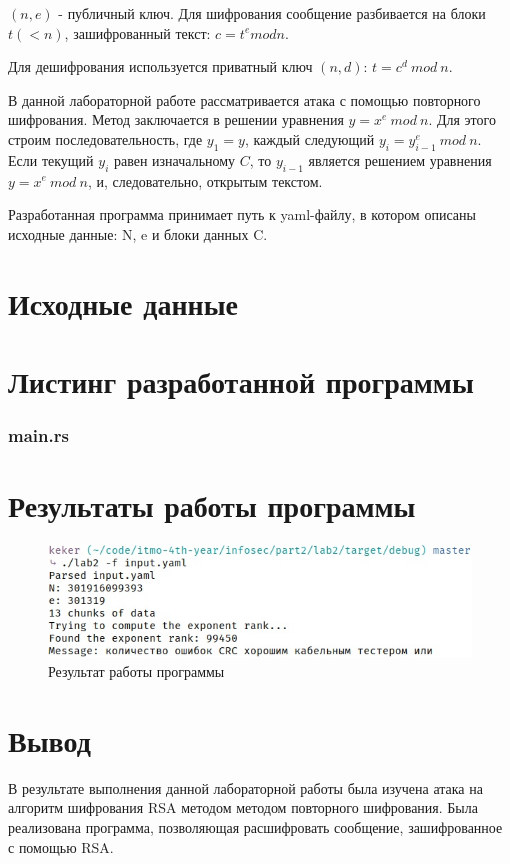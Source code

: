 \documentclass[12pt, a4paper]{article}
\begin{document}
$(n,e)$ - публичный ключ. Для шифрования сообщение разбивается на блоки $t (<n)$,
зашифрованный текст: $c = t^e mod n$.

Для дешифрования используется приватный ключ $(n,d)$: $t = c^d\:mod\:n$.

В данной лабораторной работе рассматривается атака с помощью повторного шифрования.
Метод заключается в решении уравнения $y = x^e\:mod\:n$. Для этого строим последовательность,
где $y_1 = y$, каждый следующий $y_i = y_{i-1}^e\:mod\:n$. Если текущий $y_i$ равен
изначальному $C$, то $y_{i-1}$ является решением уравнения $y = x^e\:mod\:n$, и,
следовательно, открытым текстом.

Разработанная программа принимает путь к yaml-файлу, в котором описаны исходные
данные: N, e и блоки данных C.
\newpage
\section*{Исходные данные}



\section*{Листинг разработанной программы}

\subsubsection*{main.rs}



\section*{Результаты работы программы}

\begin{figure}[H]
    \includegraphics[scale = 0.7]{res}
    \caption{Результат работы программы}
    \centering
\end{figure}

\section*{Вывод}

В результате выполнения данной лабораторной работы была изучена атака на
алгоритм шифрования RSA методом методом повторного шифрования. Была реализована
программа, позволяющая расшифровать сообщение, зашифрованное с помощью RSA.
\end{document}
